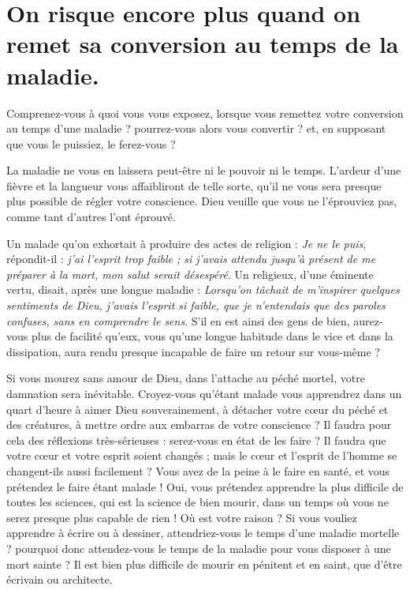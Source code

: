 \documentclass[instructions.tex]{subfiles}
\begin{document}
\chapter{On risque encore plus quand on remet sa conversion au temps de la maladie.}

Comprenez-vous à quoi vous vous exposez, lorsque vous remettez votre conversion au temps d’une maladie ? pourrez-vous alors vous convertir ? et, en supposant que vous le puissiez, le ferez-vous ?

\primo La maladie ne vous en laissera peut-être ni le pouvoir ni le temps. L’ardeur d’une fièvre et la langueur vous affaibliront de telle sorte, qu’il ne vous sera presque plus possible de régler votre conscience. Dieu veuille que vous ne l’éprouviez pas, comme tant d’autres l’ont éprouvé.

Un malade qu’on exhortait à produire des actes de religion : \textit{Je ne le puis}, répondit-il : \textit{j’ai l’esprit trop faible ; si j’avais attendu jusqu’à présent de me préparer à la mort, mon salut serait désespéré}. Un religieux, d’une éminente vertu, disait, après une longue maladie : \textit{Lorsqu’on tâchait de m’inspirer quelques sentiments de Dieu, j’avais l’esprit si faible, que je n’entendais que des paroles confuses, sans en comprendre le sens}. S’il en est ainsi des gens de bien, aurez-vous plus de facilité qu’eux, vous qu’une longue habitude dans le vice et dans la dissipation, aura rendu presque incapable de faire un retour sur vous-même ?

Si vous mourez sans amour de Dieu, dans l’attache au péché mortel, votre damnation sera inévitable. Croyez-vous qu’étant malade vous apprendrez dans un quart d’heure à aimer Dieu souverainement, à détacher votre cœur du péché et des créatures, à mettre ordre aux embarras de votre conscience ? Il faudra pour cela des réflexions très-sérieuses : serez-vous en état de les faire ? Il faudra que votre cœur et votre esprit soient changés ; mais le cœur et l’esprit de l’homme se changent-ils aussi facilement ? Vous avez de la peine à le faire en santé, et vous prétendez le faire étant malade ! Oui, vous prétendez apprendre la plus difficile de toutes les sciences, qui est la science de bien mourir, dans un temps où vous ne serez presque plus capable de rien ! Où est votre raison ? Si vous vouliez apprendre à écrire ou à dessiner, attendriez-vous le temps d’une maladie mortelle ? pourquoi donc attendez-vous le temps de la maladie pour vous disposer à une mort sainte ? Il est bien plus difficile de mourir en pénitent et en saint, que d’être écrivain ou architecte.
\end{document}
